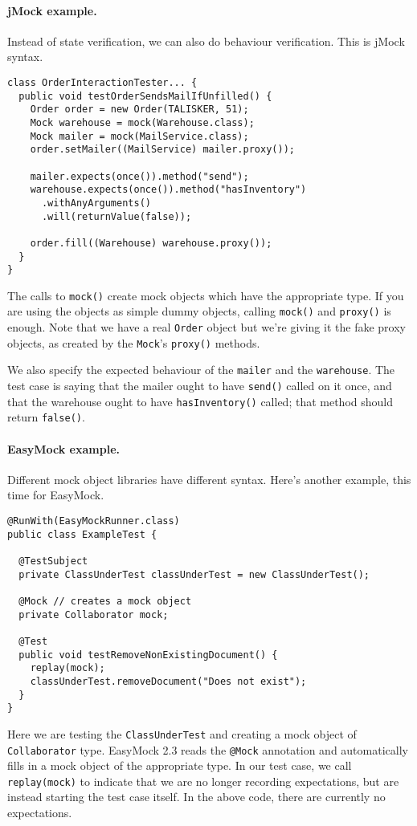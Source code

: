 \documentclass[11pt]{article}
\begin{document}
\paragraph{jMock example.} 
Instead of state verification, we can also do behaviour verification. This is
jMock syntax.
\begin{lstlisting}
class OrderInteractionTester... {
  public void testOrderSendsMailIfUnfilled() {
    Order order = new Order(TALISKER, 51);
    Mock warehouse = mock(Warehouse.class);
    Mock mailer = mock(MailService.class);
    order.setMailer((MailService) mailer.proxy());

    mailer.expects(once()).method("send");
    warehouse.expects(once()).method("hasInventory")
      .withAnyArguments()
      .will(returnValue(false));

    order.fill((Warehouse) warehouse.proxy());
  }
}
\end{lstlisting}
The calls to {\tt mock()} create mock objects which have the
appropriate type.  If you are using the objects as simple dummy
objects, calling {\tt mock()} and {\tt proxy()} is enough. Note that
we have a real {\tt Order} object but we're giving it the fake proxy
objects, as created by the {\tt Mock}'s {\tt proxy()} methods.

We also specify the expected behaviour of the {\tt mailer} and the
{\tt warehouse}. The test case is saying that the mailer ought to have
{\tt send()} called on it once, and that the warehouse ought to have
{\tt hasInventory()} called; that method should return {\tt false()}.

\paragraph{EasyMock example.} Different mock object libraries have different syntax. Here's 
another example, this time for EasyMock.

\begin{lstlisting}
@RunWith(EasyMockRunner.class)
public class ExampleTest {

  @TestSubject
  private ClassUnderTest classUnderTest = new ClassUnderTest();

  @Mock // creates a mock object
  private Collaborator mock;

  @Test
  public void testRemoveNonExistingDocument() {
    replay(mock);
    classUnderTest.removeDocument("Does not exist");
  }
}      
\end{lstlisting}
Here we are testing the {\tt ClassUnderTest} and creating a mock object
of {\tt Collaborator} type. EasyMock 2.3 reads the {\tt @Mock} annotation
and automatically fills in a mock object of the appropriate type.
In our test case, we call {\tt replay(mock)} to indicate that we are no
longer recording expectations, but are instead starting the test case itself.
In the above code, there are currently no expectations.
\end{document}
